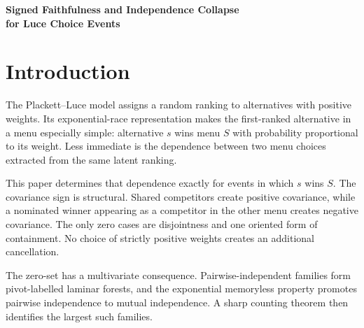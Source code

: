 \documentclass[11pt]{article}
\theoremstyle{definition}
\newcommand{\1}{\mathbf{1}}
\begin{document}
\begin{center}
{\LARGE\bfseries Signed Faithfulness and Independence Collapse\\[3pt]
for Luce Choice Events\par}
\end{center}

\begin{abstract}
Let a Plackett--Luce ranking be generated by independent exponential clocks, and consider events
asserting that a specified item ranks first in a specified menu. We derive the exact covariance of
every pair of such events. Its sign is determined entirely by the overlap geometry of the menus and
their specified winners, independently of all positive rate parameters. Zero covariance occurs
exactly for disjoint menus or for properly nested menus whose larger-menu winner lies outside the
smaller menu. Every pairwise-independent finite collection is then mutually independent: its menus
form a pivot-labelled laminar forest. If the collection uses \(n\) items and has \(r\) maximal
menus, its size is at most \(n-r\); equality is attained exactly by disjoint unions of full flags.
The conclusions extend verbatim to independent proportional-hazards races. The result gives a
parameter-free dependence classification for overlapping choices extracted from one latent
ranking.
\end{abstract}

\section{Introduction}

The Plackett--Luce model assigns a random ranking to alternatives with positive weights. Its
exponential-race representation makes the first-ranked alternative in a menu especially simple:
alternative \(s\) wins menu \(S\) with probability proportional to its weight. Less immediate is
the dependence between two menu choices extracted from the same latent ranking.

This paper determines that dependence exactly for events in which \(s\) wins \(S\). The covariance
sign is structural. Shared competitors create positive covariance, while a nominated winner
appearing as a competitor in the other menu creates negative covariance. The only zero cases are
disjointness and one oriented form of containment. No choice of strictly positive weights creates
an additional cancellation.

The zero-set has a multivariate consequence. Pairwise-independent families form pivot-labelled
laminar forests, and the exponential memoryless property promotes pairwise independence to mutual
independence. A sharp counting theorem then identifies the largest such families.
\end{document}
